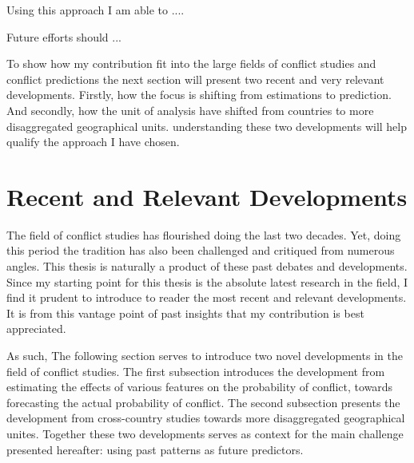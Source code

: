 \documentclass[a4paper]{article}
\begin{document}
Using this approach I am able to ....\par %

Future efforts should ...\par

To show how my contribution fit into the large fields of conflict studies and conflict predictions the next section will present two recent and very relevant developments. Firstly, how the focus is shifting from estimations to prediction. And secondly, how the unit of analysis have shifted from countries to more disaggregated geographical units. understanding these two developments will help qualify the approach I have chosen.\par

\section{Recent and Relevant Developments}\label{challenges}


The field of conflict studies has flourished doing the last two decades. Yet, doing this period the tradition has also been challenged and critiqued from numerous angles. This thesis is naturally a product of these past debates and developments. Since my starting point for this thesis is the absolute latest research in the field, I find it prudent to introduce to reader the most recent and relevant developments. It is from this vantage point of past insights that my contribution is best appreciated.\par

As such, The following section serves to introduce two novel developments in the field of conflict studies. The first subsection introduces the development from estimating the effects of various features on the probability of conflict, towards forecasting the actual probability of conflict. The second subsection presents the development from cross-country studies towards more disaggregated geographical unites. Together these two developments serves as context for the main challenge presented hereafter: using past patterns as future predictors.\par
\end{document}
